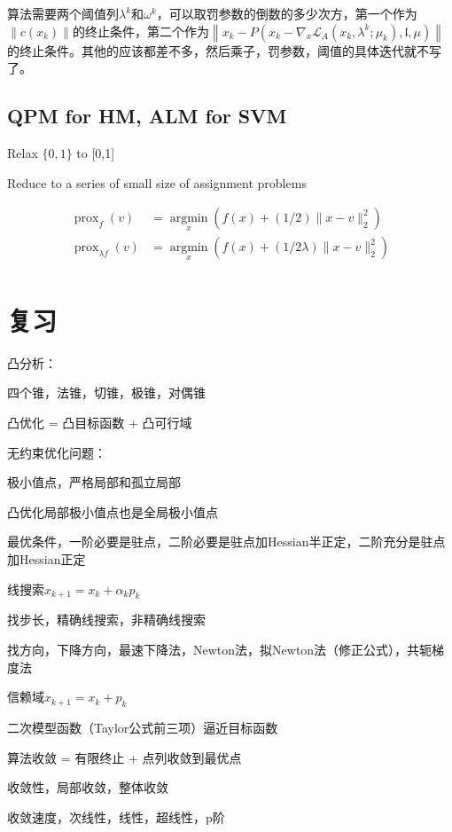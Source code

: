 算法需要两个阈值列$\lambda^k$和$\omega^k$，可以取罚参数的倒数的多少次方，第一个作为$\|c(x_k)\|$的终止条件，第二个作为$\left\|x_{k}-P\left(x_{k}-\nabla_{x} \mathcal{L}_{A}\left(x_{k}, \lambda^{k} ; \mu_{k}\right), \mathfrak{l}, \mu\right)\right\|$的终止条件。其他的应该都差不多，然后乘子，罚参数，阈值的具体迭代就不写了。

\subsection{QPM for HM, ALM for SVM}

Relax $\{0, 1\}$ to [0,1]

Reduce to a series of small size of assignment problems

\[
  \begin{aligned}
    \operatorname{prox}_{f}(v)&=\underset{x}{\operatorname{argmin}}\left(f(x)+(1 / 2)\|x-v\|_{2}^{2}\right)\\
    \operatorname{prox}_{\lambda f}(v)&=\underset{x}{\operatorname{argmin}}\left(f(x)+(1 / 2 \lambda)\|x-v\|_{2}^{2}\right)\\
  \end{aligned}
\]

\section*{复习}

凸分析：

四个锥，法锥，切锥，极锥，对偶锥

凸优化 = 凸目标函数 + 凸可行域

无约束优化问题：

极小值点，严格局部和孤立局部

凸优化局部极小值点也是全局极小值点

最优条件，一阶必要是驻点，二阶必要是驻点加Hessian半正定，二阶充分是驻点加Hessian正定

线搜索$x_{k + 1} = x_k + \alpha_k p_k$

找步长，精确线搜索，非精确线搜索

找方向，下降方向，最速下降法，Newton法，拟Newton法（修正公式），共轭梯度法

信赖域$x_{k + 1} = x_k + p_k$

二次模型函数（Taylor公式前三项）逼近目标函数

算法收敛 = 有限终止 + 点列收敛到最优点

收敛性，局部收敛，整体收敛

收敛速度，次线性，线性，超线性，p阶

